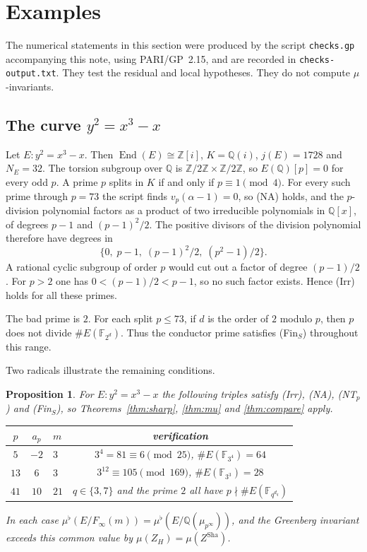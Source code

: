 \documentclass[11pt]{article}
\newtheorem{proposition}[theorem]{Proposition}
\theoremstyle{definition}
\theoremstyle{remark}
\newcommand{\Z}{\mathbb{Z}}
\newcommand{\Q}{\mathbb{Q}}
\newcommand{\F}{\mathbb{F}}
\newcommand{\Sha}{\operatorname{Sha}}
\newcommand{\End}{\operatorname{End}}
\newcommand{\flatp}{\flat}
\begin{document}
\section{Examples}
\label{sec:examples}

The numerical statements in this section were produced by the script \texttt{checks.gp} accompanying this note, using PARI/GP~2.15, and are recorded in \texttt{checks-output.txt}. They test the residual and local hypotheses. They do not compute \(\mu\)-invariants.

\subsection{The curve \(y^2=x^3-x\)}

Let \(E:y^2=x^3-x\). Then \(\End(E)\cong\Z[i]\), \(K=\Q(i)\), \(j(E)=1728\) and \(N_E=32\). The torsion subgroup over \(\Q\) is \(\Z/2\Z\times\Z/2\Z\), so \(E(\Q)[p]=0\) for every odd \(p\). A prime \(p\) splits in \(K\) if and only if \(p\equiv 1\pmod{4}\). For every such prime through \(p=73\) the script finds \(v_p(\alpha-1)=0\), so (NA) holds, and the \(p\)-division polynomial factors as a product of two irreducible polynomials in \(\Q[x]\), of degrees \(p-1\) and \((p-1)^2/2\). The positive divisors of the division polynomial therefore have degrees in
\[
\bigl\{0,\; p-1,\; (p-1)^2/2,\; (p^2-1)/2\bigr\}.
\]
A rational cyclic subgroup of order \(p\) would cut out a factor of degree \((p-1)/2\). For \(p>2\) one has \(0<(p-1)/2<p-1\), so no such factor exists. Hence (Irr) holds for all these primes.

The bad prime is \(2\). For each split \(p\le 73\), if \(d\) is the order of \(2\) modulo \(p\), then \(p\) does not divide \(\#E(\F_{2^d})\). Thus the conductor prime satisfies (Fin\(_S\)) throughout this range.

Two radicals illustrate the remaining conditions.

\begin{proposition}
\label{prop:ex1}
For \(E:y^2=x^3-x\) the following triples satisfy \textup{(Irr)}, \textup{(NA)}, \textup{(NT\(_p\))} and \textup{(Fin\(_S\))}, so Theorems~\ref{thm:sharp}, \ref{thm:mu} and \ref{thm:compare} apply.
\begin{center}
\begin{tabular}{cclc}
\(p\) & \(a_p\) & \(m\) & verification\\
\hline
\(5\) & \(-2\) & \(3\) & \(3^4=81\equiv 6\pmod{25}\), \(\#E(\F_{3^4})=64\)\\
\(13\) & \(6\) & \(3\) & \(3^{12}\equiv 105\pmod{169}\), \(\#E(\F_{3^3})=28\)\\
\(41\) & \(10\) & \(21\) & \(q\in\{3,7\}\) and the prime \(2\) all have \(p\nmid\#E(\F_{q^{d_q}})\)\\
\end{tabular}
\end{center}
In each case \(\mu^{\flatp}(E/F_\infty(m))=\mu^{\flatp}(E/\Q(\mu_{p^\infty}))\), and the Greenberg invariant exceeds this common value by \(\mu(Z_H)=\mu(Z^{\Sha})\).
\end{proposition}
\end{document}
